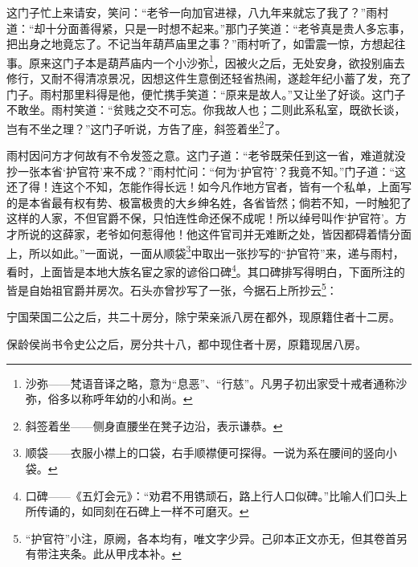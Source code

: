\par 这门子忙上来请安，笑问：“老爷一向加官进禄，八九年来就忘了我了？”雨村道：“却十分面善得紧，只是一时想不起来。”那门子笑道：“老爷真是贵人多忘事，把出身之地竟忘了。不记当年葫芦庙里之事？”雨村听了，如雷震一惊，方想起往事。原来这门子本是葫芦庙内一个小沙弥\footnote{沙弥——梵语音译之略，意为“息恶”、“行慈”。凡男子初出家受十戒者通称沙弥，俗多以称呼年幼的小和尚。}，因被火之后，无处安身，欲投别庙去修行，又耐不得清凉景况，因想这件生意倒还轻省热闹，遂趁年纪小蓄了发，充了门子。雨村那里料得是他，便忙携手笑道：“原来是故人。”又让坐了好谈。这门子不敢坐。雨村笑道：“贫贱之交不可忘。你我故人也；二则此系私室，既欲长谈，岂有不坐之理？”这门子听说，方告了座，斜签着坐\footnote{斜签着坐——侧身直腰坐在凳子边沿，表示谦恭。}了。
\par 雨村因问方才何故有不令发签之意。这门子道：“老爷既荣任到这一省，难道就没抄一张本省‘护官符’来不成？”雨村忙问：“何为‘护官符’？我竟不知。”门子道：“这还了得！连这个不知，怎能作得长远！如今凡作地方官者，皆有一个私单，上面写的是本省最有权有势、极富极贵的大乡绅名姓，各省皆然；倘若不知，一时触犯了这样的人家，不但官爵不保，只怕连性命还保不成呢！所以绰号叫作‘护官符’。方才所说的这薛家，老爷如何惹得他！他这件官司并无难断之处，皆因都碍着情分面上，所以如此。”一面说，一面从顺袋\footnote{顺袋——衣服小襟上的口袋，右手顺襟便可探得。一说为系在腰间的竖向小袋。}中取出一张抄写的“护官符”来，递与雨村，看时，上面皆是本地大族名宦之家的谚俗口碑\footnote{口碑——《五灯会元》：“劝君不用镌顽石，路上行人口似碑。”比喻人们口头上所传诵的，如同刻在石碑上一样不可磨灭。}。其口碑排写得明白，下面所注的皆是自始祖官爵并房次。石头亦曾抄写了一张，今据石上所抄云\footnote{“护官符”小注，原阙，各本均有，唯文字少异。己卯本正文亦无，但其卷首另有带注夹条。此从甲戌本补。}：
\par 宁国荣国二公之后，共二十房分，除宁荣亲派八房在都外，现原籍住者十二房。
\par 保龄侯尚书令史公之后，房分共十八，都中现住者十房，原籍现居八房。
